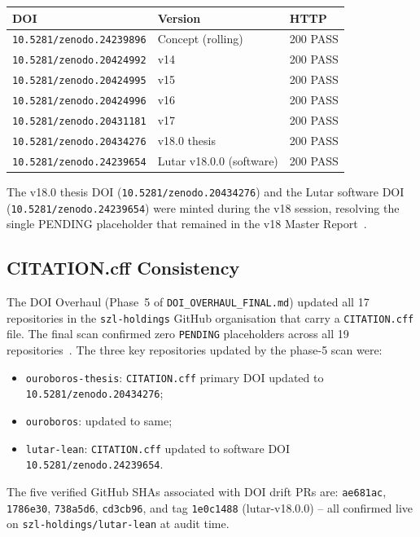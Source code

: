 \begin{center}
\begin{tabular}{lll}
  \textbf{DOI} & \textbf{Version} & \textbf{HTTP} \\
  \hline
  \texttt{10.5281/zenodo.24239896} & Concept (rolling) & 200 PASS \\
  \texttt{10.5281/zenodo.20424992} & v14 & 200 PASS \\
  \texttt{10.5281/zenodo.20424995} & v15 & 200 PASS \\
  \texttt{10.5281/zenodo.20424996} & v16 & 200 PASS \\
  \texttt{10.5281/zenodo.20431181} & v17 & 200 PASS \\
  \texttt{10.5281/zenodo.20434276} & v18.0 thesis & 200 PASS \\
  \texttt{10.5281/zenodo.24239654} & Lutar v18.0.0 (software) & 200 PASS \\
\end{tabular}
\end{center}

The v18.0 thesis DOI (\texttt{10.5281/zenodo.20434276}) and the Lutar
software DOI (\texttt{10.5281/zenodo.24239654}) were minted during the
v18 session, resolving the single PENDING placeholder that remained in the
v18 Master Report~\cite{szl_master_v18}.

\subsection{CITATION.cff Consistency}
\label{ssec:citation-cff}

The DOI Overhaul (Phase~5 of \texttt{DOI\_OVERHAUL\_FINAL.md}) updated all
17 repositories in the \texttt{szl-holdings} GitHub organisation that carry
a \texttt{CITATION.cff} file.  The final scan confirmed zero
\texttt{PENDING} placeholders across all 19 repositories~\cite{szl_zoom_out_v18}.
The three key repositories updated by the phase-5 scan were:

\begin{itemize}
  \item \texttt{ouroboros-thesis}: \texttt{CITATION.cff} primary DOI
    updated to \texttt{10.5281/zenodo.20434276};
  \item \texttt{ouroboros}: updated to same;
  \item \texttt{lutar-lean}: \texttt{CITATION.cff} updated to software
    DOI \texttt{10.5281/zenodo.24239654}.
\end{itemize}

The five verified GitHub SHAs associated with DOI drift PRs are:
\texttt{ae681ac}, \texttt{1786e30}, \texttt{738a5d6}, \texttt{cd3cb96},
and tag \texttt{1e0c1488} (lutar-v18.0.0) -- all confirmed live on
\texttt{szl-holdings/lutar-lean} at audit time.

